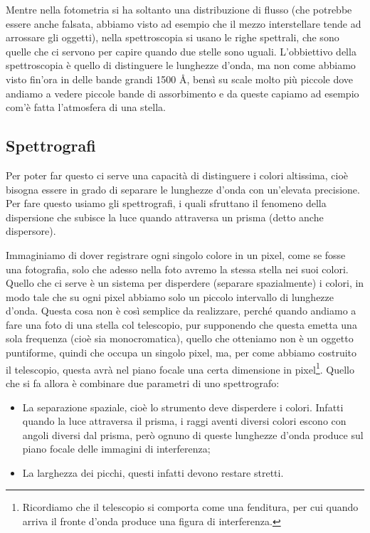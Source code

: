 Mentre nella fotometria si ha soltanto una distribuzione di flusso (che potrebbe essere anche falsata, abbiamo visto ad esempio che il mezzo interstellare tende ad arrossare gli oggetti), nella spettroscopia si usano le righe spettrali, che sono quelle che ci servono per capire quando due stelle sono uguali. L'obbiettivo della spettroscopia è quello di distinguere le lunghezze d'onda, ma non come abbiamo visto fin'ora in delle bande grandi 1500 \AA, bensì su scale molto più piccole dove andiamo a vedere piccole bande di assorbimento e da queste capiamo ad esempio com'è fatta l'atmosfera di una stella.

\subsection{Spettrografi}

Per poter far questo ci serve una capacità di distinguere i colori altissima, cioè bisogna essere in grado di separare le lunghezze d'onda con un'elevata precisione. Per fare questo usiamo gli spettrografi, i quali sfruttano il fenomeno della dispersione che subisce la luce quando attraversa un prisma (detto anche dispersore).

Immaginiamo di dover registrare ogni singolo colore in un pixel, come se fosse una fotografia, solo che adesso nella foto avremo la stessa stella nei suoi colori. Quello che ci serve è un sistema per disperdere (separare spazialmente) i colori, in modo tale che su ogni pixel abbiamo solo un piccolo intervallo di lunghezze d'onda. Questa cosa non è così semplice da realizzare, perché quando andiamo a fare una foto di una stella col telescopio, pur supponendo che questa emetta una sola frequenza (cioè sia monocromatica), quello che otteniamo non è un oggetto puntiforme, quindi che occupa un singolo pixel, ma, per come abbiamo costruito il telescopio, questa avrà nel piano focale una certa dimensione in pixel\footnote{Ricordiamo che il telescopio si comporta come una fenditura, per cui quando arriva il fronte d'onda produce una figura di interferenza.}. Quello che si fa allora è combinare due parametri di uno spettrografo:

\begin{itemize}
   \item La separazione spaziale, cioè lo strumento deve disperdere i colori. Infatti quando la luce attraversa il prisma, i raggi aventi diversi colori escono con angoli diversi dal prisma, però ognuno di queste lunghezze d'onda produce sul piano focale delle immagini di interferenza;

   \item La larghezza dei picchi, questi infatti devono restare stretti.
\end{itemize}

